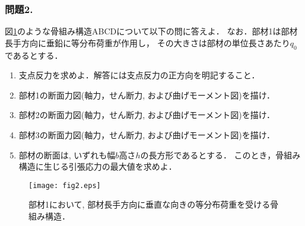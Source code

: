 \documentclass[10pt,a4j]{jarticle}
\begin{document}
\subsubsection*{問題2.}
図\ref{fig:fig2}のような骨組み構造ABCDについて以下の問に答えよ．
なお．部材1は部材長手方向に垂鉛に等分布荷重が作用し，
その大きさは部材の単位長さあたり$q_0$であるとする．
\begin{enumerate}
\item
	支点反力を求めよ．解答には支点反力の正方向を明記すること．
\item	
	部材1の断面力図(軸力，せん断力, および曲げモーメント図)を描け．
\item	
	部材2の断面力図(軸力，せん断力, および曲げモーメント図)を描け．
\item	
	部材3の断面力図(軸力，せん断力, および曲げモーメント図)を描け．
\item	
	部材の断面は, いずれも幅$b$高さ$h$の長方形であるとする．
	このとき，骨組み構造に生じる引張応力の最大値を求めよ．
\end{enumerate}
\begin{figure}[h]
	\begin{center}
	\texttt{[image: fig2.eps]} 
	\end{center}
	\caption{
		部材1において, 部材長手方向に垂直な向きの等分布荷重を受ける骨組み構造．
	} 
	\label{fig:fig2}
\end{figure}
\end{document}
